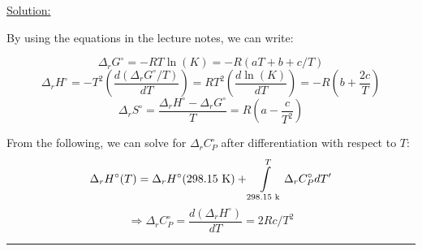 \noindent
\underline{Solution:}

By using the equations in the lecture notes, we can write:

$$\Delta_rG^\circ = -RT\ln(K) = -R\left(aT+b+c/T\right)$$
$$\Delta_rH^\circ = -T^2\left(\frac{d\left(\Delta_rG^\circ/T\right)}{dT}\right) = RT^2\left(\frac{d\ln(K)}{dT}\right) = -R\left(b+\frac{2c}{T}\right)$$
$$\Delta_rS^\circ = \frac{\Delta_rH^\circ - \Delta_rG^\circ}{T} = R\left(a - \frac{c}{T^2}\right)$$

From the following, we can solve for $\Delta_rC_P^\circ$ after differentiation with respect to $T$:
$$\Delta_rH^\circ(T) = \Delta_rH^\circ(298.15\textnormal{ K}) + \int\limits_{298.15\textnormal{ k}}^T\Delta_rC_P^\circ dT'$$
$$\Rightarrow \Delta_rC_P^\circ = \frac{d\left(\Delta_rH^\circ\right)}{dT} = 2Rc/T^2$$


\hrule\vspace{0.5cm}
